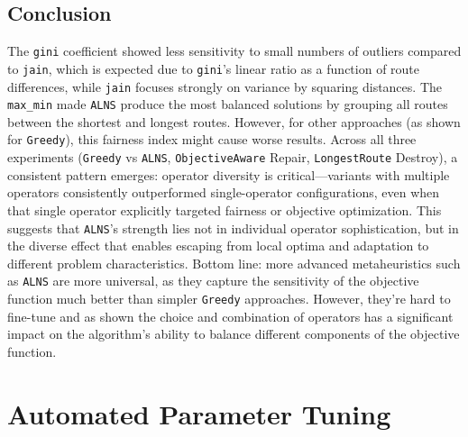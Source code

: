 \documentclass[a4paper]{scrartcl}
\begin{document}
\subsection{Conclusion}
The \texttt{gini} coefficient showed less sensitivity to small numbers of outliers compared to \texttt{jain}, which is expected due to \texttt{gini}'s linear ratio as a function of route differences, while \texttt{jain} focuses strongly on variance by squaring distances.
The \texttt{max\_min} made \texttt{ALNS} produce the most balanced solutions by grouping all routes between the shortest and longest routes.
However, for other approaches (as shown for \texttt{Greedy}), this fairness index might cause worse results.
Across all three experiments (\texttt{Greedy} vs \texttt{ALNS}, \texttt{ObjectiveAware} Repair, \texttt{LongestRoute} Destroy), a consistent pattern emerges: operator diversity is critical—variants with multiple operators consistently outperformed single-operator configurations, even when that single operator explicitly targeted fairness or objective optimization.
This suggests that \texttt{ALNS}'s strength lies not in individual operator sophistication, but in the diverse effect that enables escaping from local optima and adaptation to different problem characteristics.
Bottom line: more advanced metaheuristics such as \texttt{ALNS} are more universal, as they capture the sensitivity of the objective function much better than simpler \texttt{Greedy} approaches.
However, they're hard to fine-tune and as shown the choice and combination of operators has a significant impact on the algorithm's ability to balance different components of the objective function.

\section{Automated Parameter Tuning}
\end{document}
